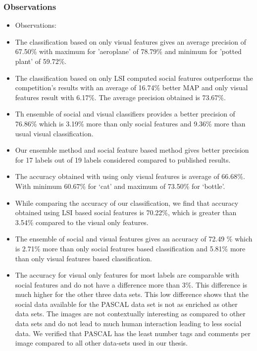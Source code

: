 \subsubsection*{Observations}


\begin{itemize}
\item Observations:

\item The classification based on only visual features gives an 
average precision of 67.50\% with maximum for 'aeroplane' of 78.79\% 
and minimum for 'potted plant' of 59.72\%.

\item The classification based on only LSI computed social features 
outperforms the competition's results with an average of 16.74\% 
better MAP and only visual features result with 6.17\%. The average 
precision obtained is 73.67\%.

\item Th ensemble of social and visual classifiers provides a better 
precision of 76.86\% which is 3.19\% more than only social features 
and 9.36\% more than usual visual classification.

\item Our ensemble method and social feature based method gives better precision for 17 labels out of 19 labels considered compared 
to published results.

\item The accuracy obtained with using only visual features is average of 66.68\%. With minimum 60.67\% for `cat' and maximum of 
73.50\% for `bottle'.

\item While comparing the accuracy of our classification, we find that accuracy obtained using LSI based social features is 70.22\%, 
which is greater than 3.54\% compared to the visual only features.

\item The ensemble of social and visual features gives an accuracy of 
72.49 \% which is 2.71\% more than only social features based 
classification and 5.81\% more than only visual features based 
classification.

\item The accuracy for visual only features for most labels are comparable with social features and do not have a difference more than 3\%. This difference is much higher for the other three data sets. This low difference shows that the social data available for the PASCAL 
data set is not as enriched as other data sets. The images are not contextually interesting as compared to other data sets and do not 
lead to much human interaction leading to less social data. We verified that PASCAL has the least number tags and comments per image compared to all other data-sets used in our thesis.

\end{itemize}


